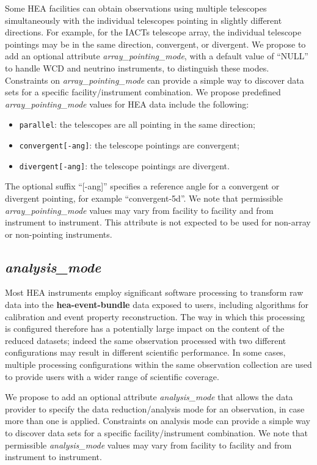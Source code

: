 \documentclass[11pt,a4paper]{ivoa}
\begin{document}
Some \gls{HEA} facilities can obtain observations using multiple telescopes simultaneously with the individual telescopes pointing in slightly different directions.  For example, for the \glspl{IACT} telescope array, the individual telescope pointings may be in the same direction, convergent, or divergent.  We propose to add an optional attribute {\em array\_pointing\_mode\/}, with a default value of ``NULL'' to handle \gls{WCD} and neutrino instruments, to distinguish these modes.  Constraints on {\em array\_pointing\_mode\/} can provide a simple way to discover data sets for a specific facility/instrument combination.  We propose predefined {\em array\_pointing\_mode\/} values for \gls{HEA} data include the following:
\begin{itemize}
	\item \texttt{parallel}: the telescopes are all pointing in the same direction;
	\item \texttt{convergent[-ang]}: the telescope pointings are convergent;
	\item \texttt{divergent[-ang]}: the telescope pointings are divergent.
\end{itemize}
The optional suffix ``[-ang]'' specifies a reference angle for a convergent or divergent pointing, for example ``convergent-5d''.  We note that permissible {\em array\_pointing\_mode\/} values may vary from facility to facility and from instrument to instrument. This attribute is not expected to be used for non-array or non-pointing instruments.

\subsection{{\em analysis\_mode}}

Most \gls{HEA} instruments employ significant software processing to transform raw data into the {\bf hea-event-bundle} data exposed to users, including algorithms for calibration and event property reconstruction. The way in which this processing is configured therefore has a potentially large impact on the content of the reduced datasets; indeed the same observation processed with two different configurations may result in different scientific performance. In some cases, multiple processing configurations within the same observation collection are used to provide users with a wider range of scientific coverage.

We propose to add an optional attribute {\em analysis\_mode\/} that allows the data provider to specify the data reduction/analysis mode for an observation, in case more than one is applied. Constraints on analysis mode can provide a simple way to discover data sets for a specific facility/instrument combination. We note that permissible {\em analysis\_mode\/} values may vary from facility to facility and from instrument to instrument.
\end{document}
